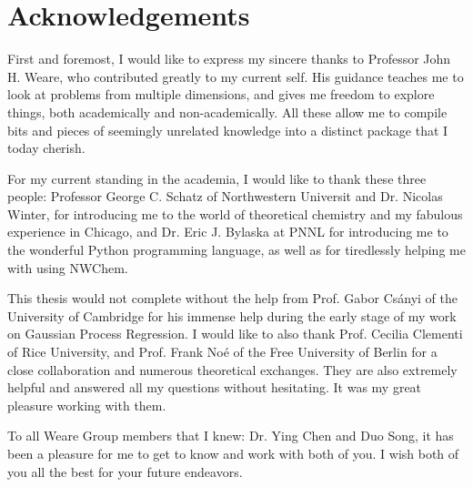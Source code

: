 \newpage

\begingroup
\renewcommand{\cleardoublepage}{}
\clearpage
\chapter*{Acknowledgements}
\endgroup

\begin{spacing}{2.0}
First and foremost, I would like to express my sincere thanks to Professor John H. Weare, who contributed greatly to my current self.
His guidance teaches me to look at problems from multiple dimensions, and gives me freedom to explore things, both academically and
non-academically. All these allow me to compile bits and pieces of seemingly unrelated knowledge into a distinct package that
I today cherish.

For my current standing in the academia, I would like to thank these three people: Professor George C. Schatz of Northwestern Universit
and Dr. Nicolas Winter, for introducing me to the world of theoretical chemistry and my fabulous experience in Chicago, and Dr. Eric J. 
Bylaska at PNNL for introducing me to the wonderful Python programming language, as well as for tiredlessly helping me with using NWChem.

This thesis would not complete without the help from Prof. Gabor Cs\'{a}nyi of the University of Cambridge for his immense help
during the early stage of my work on Gaussian Process Regression. I would like to also thank Prof. Cecilia Clementi of Rice University,
and Prof. Frank No\'{e} of the Free University of Berlin for a close collaboration and numerous theoretical exchanges. They are also
extremely helpful and answered all my questions without hesitating. It was my great pleasure working with them.

To all Weare Group members that I knew: Dr. Ying Chen and Duo Song, it has been a pleasure for me to get to know and work with both of you.
I wish both of you all the best for your future endeavors.


\end{spacing}

